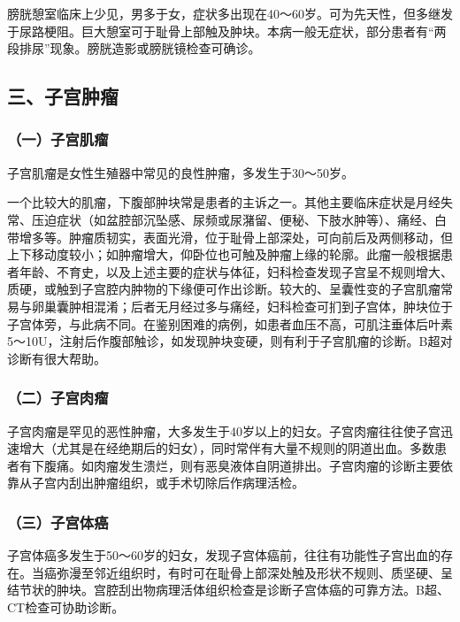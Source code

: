 膀胱憩室临床上少见，男多于女，症状多出现在40～60岁。可为先天性，但多继发于尿路梗阻。巨大憩室可于耻骨上部触及肿块。本病一般无症状，部分患者有“两段排尿”现象。膀胱造影或膀胱镜检查可确诊。

\subsection{三、子宫肿瘤}

\subsubsection{（一）子宫肌瘤}

子宫肌瘤是女性生殖器中常见的良性肿瘤，多发生于30～50岁。

一个比较大的肌瘤，下腹部肿块常是患者的主诉之一。其他主要临床症状是月经失常、压迫症状（如盆腔部沉坠感、尿频或尿潴留、便秘、下肢水肿等）、痛经、白带增多等。肿瘤质韧实，表面光滑，位于耻骨上部深处，可向前后及两侧移动，但上下移动度较小；如肿瘤增大，仰卧位也可触及肿瘤上缘的轮廓。此瘤一般根据患者年龄、不育史，以及上述主要的症状与体征，妇科检查发现子宫呈不规则增大、质硬，或触到子宫腔内肿物的下缘便可作出诊断。较大的、呈囊性变的子宫肌瘤常易与卵巢囊肿相混淆；后者无月经过多与痛经，妇科检查可扪到子宫体，肿块位于子宫体旁，与此病不同。在鉴别困难的病例，如患者血压不高，可肌注垂体后叶素5～10U，注射后作腹部触诊，如发现肿块变硬，则有利于子宫肌瘤的诊断。B超对诊断有很大帮助。

\subsubsection{（二）子宫肉瘤}

子宫肉瘤是罕见的恶性肿瘤，大多发生于40岁以上的妇女。子宫肉瘤往往使子宫迅速增大（尤其是在经绝期后的妇女），同时常伴有大量不规则的阴道出血。多数患者有下腹痛。如肉瘤发生溃烂，则有恶臭液体自阴道排出。子宫肉瘤的诊断主要依靠从子宫内刮出肿瘤组织，或手术切除后作病理活检。

\subsubsection{（三）子宫体癌}

子宫体癌多发生于50～60岁的妇女，发现子宫体癌前，往往有功能性子宫出血的存在。当癌弥漫至邻近组织时，有时可在耻骨上部深处触及形状不规则、质坚硬、呈结节状的肿块。宫腔刮出物病理活体组织检查是诊断子宫体癌的可靠方法。B超、CT检查可协助诊断。

\protect\hypertarget{text00235.html}{}{}

